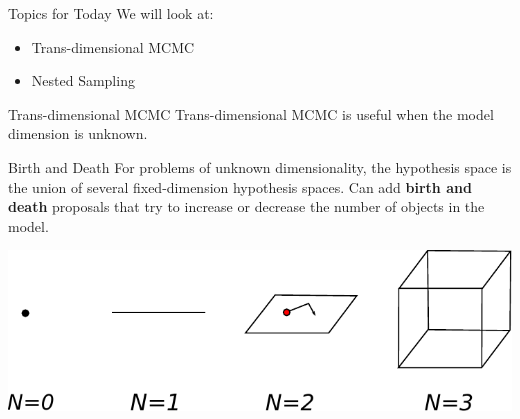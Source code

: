 
\begin{frame}[t,plain]
\titlepage
\end{frame}

\begin{frame}[t]{Topics for Today}
We will look at:

\begin{itemize}
\item Trans-dimensional MCMC
\item Nested Sampling
\end{itemize}

\end{frame}


\begin{frame}[t]{Trans-dimensional MCMC}
Trans-dimensional MCMC is useful when the model dimension is unknown.
\end{frame}

\begin{frame}[t]{Birth and Death}
For problems of unknown dimensionality, the hypothesis space is the union
of several fixed-dimension hypothesis spaces. Can add {\bf birth and death}
proposals that try to increase or decrease the number of objects in the model.

\begin{center}
\includegraphics[scale=0.7]{drawing.pdf}
\end{center}

\end{frame}


